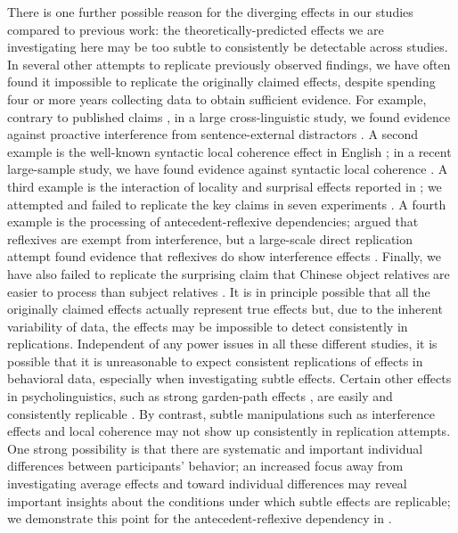 \documentclass[a4paper, man, floatsintext]{apa7}
\begin{document}
There is one further possible reason for the diverging effects in our studies compared to previous work: the theoretically-predicted effects we are investigating here may be too subtle to consistently be detectable across studies. In several other attempts to replicate previously observed findings, we have often found it impossible to replicate the originally claimed effects, despite spending four or more years collecting data to obtain sufficient evidence. For example, contrary to published claims \parencite[e.g.,][]{vandyke_mcelree06}, in a large cross-linguistic study, we found evidence against proactive interference from sentence-external distractors \parencite{mertzen_repVDM2006}. A second example is the well-known syntactic local coherence effect in English \parencite{taboretal04}; in a recent large-sample study, we have found evidence against syntactic local coherence \parencite{lcpaape2023}.  A third example is the interaction of locality and surprisal effects reported in \textcite{levy&keller_2013}; we attempted and failed to replicate the key claims in seven experiments \parencite{vasishth2018_signficancefilter}. A fourth example is the processing of antecedent-reflexive dependencies; \textcite{dillon2013} argued that reflexives are exempt from interference, but a large-scale direct replication attempt  \parencite{jaeger_etal_2020} found evidence that reflexives do show interference effects \parencite[cf.][]{yadav2021individual}. Finally, we have also failed to replicate the surprising claim  \parencite{gibsonwu,hsiao03} that Chinese object relatives are easier to process than subject relatives \parencite{VasishthetalPLoSOne2013,VasishthetalPLoSOne2013}. It is in principle possible that all the originally claimed effects actually represent true effects but, due to the inherent variability of data, the effects may be impossible to detect consistently in replications.  Independent of any power issues in all these different studies, it is possible that it is unreasonable to expect consistent replications of effects in behavioral data, especially when investigating subtle effects.  Certain other effects in psycholinguistics, such as strong garden-path effects \parencite{frazierrayner82}, are easily and consistently replicable \parencite[e.g.,][]{huang2023surprisal}. By contrast, subtle manipulations such as interference effects and local coherence may not show up consistently in replication attempts. One strong possibility is that there are systematic and important individual differences between participants' behavior; an increased focus away from investigating average effects and toward individual differences may reveal important insights about the conditions under which subtle effects are replicable; we demonstrate this point for the antecedent-reflexive dependency in \parencite{yadav2021individual}.
\end{document}
